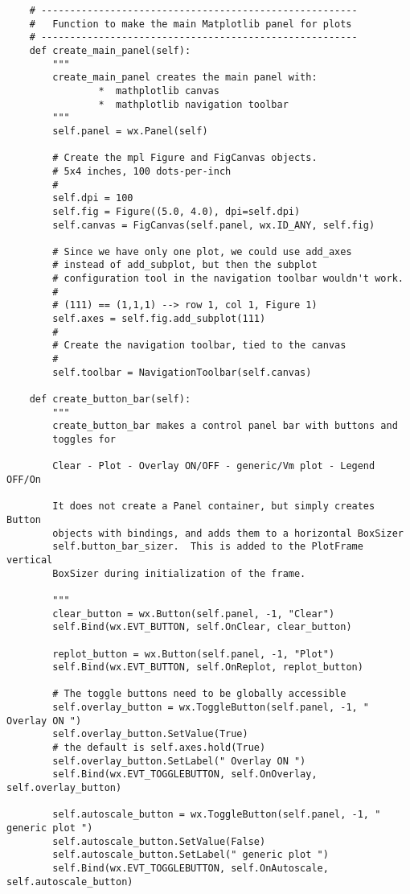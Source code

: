 \documentclass[12pt]{article}
\begin{document}
\begin{verbatim}
    # -------------------------------------------------------
    #   Function to make the main Matplotlib panel for plots
    # -------------------------------------------------------
    def create_main_panel(self):
        """ 
        create_main_panel creates the main panel with:
                *  mathplotlib canvas 
                *  mathplotlib navigation toolbar
        """
        self.panel = wx.Panel(self)
        
        # Create the mpl Figure and FigCanvas objects. 
        # 5x4 inches, 100 dots-per-inch
        #
        self.dpi = 100
        self.fig = Figure((5.0, 4.0), dpi=self.dpi)
        self.canvas = FigCanvas(self.panel, wx.ID_ANY, self.fig)
        
        # Since we have only one plot, we could use add_axes 
        # instead of add_subplot, but then the subplot
        # configuration tool in the navigation toolbar wouldn't work.
        #
        # (111) == (1,1,1) --> row 1, col 1, Figure 1)
        self.axes = self.fig.add_subplot(111)
        #
        # Create the navigation toolbar, tied to the canvas
        #
        self.toolbar = NavigationToolbar(self.canvas)

    def create_button_bar(self):
        """
        create_button_bar makes a control panel bar with buttons and
        toggles for

        Clear - Plot - Overlay ON/OFF - generic/Vm plot - Legend OFF/On
    
        It does not create a Panel container, but simply creates Button
        objects with bindings, and adds them to a horizontal BoxSizer
        self.button_bar_sizer.  This is added to the PlotFrame vertical
        BoxSizer during initialization of the frame.

        """
        clear_button = wx.Button(self.panel, -1, "Clear")
        self.Bind(wx.EVT_BUTTON, self.OnClear, clear_button)

        replot_button = wx.Button(self.panel, -1, "Plot")
        self.Bind(wx.EVT_BUTTON, self.OnReplot, replot_button)

        # The toggle buttons need to be globally accessible
        self.overlay_button = wx.ToggleButton(self.panel, -1, " Overlay ON ")
        self.overlay_button.SetValue(True)
        # the default is self.axes.hold(True)
        self.overlay_button.SetLabel(" Overlay ON ")
        self.Bind(wx.EVT_TOGGLEBUTTON, self.OnOverlay, self.overlay_button)

        self.autoscale_button = wx.ToggleButton(self.panel, -1, " generic plot ")
        self.autoscale_button.SetValue(False)
        self.autoscale_button.SetLabel(" generic plot ")
        self.Bind(wx.EVT_TOGGLEBUTTON, self.OnAutoscale, self.autoscale_button)


\end{verbatim}
\end{document}
